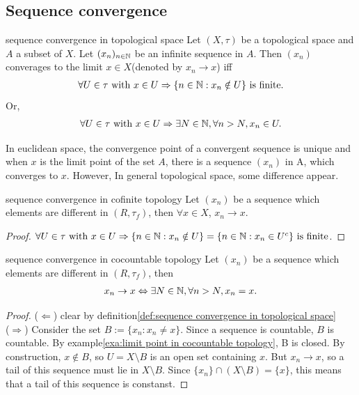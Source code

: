 \subsection{Sequence convergence}
\begin{definition}{}{sequence convergence in topological space}
    Let $(X,\tau)$ be a topological space and $A$ a subset of $X$. Let $(x_n)_{n\in\mathbb{N}}$ be an infinite sequence in $A$.
    Then $(x_n)$ converages to the limit $x\in X$(denoted by $x_n\rightarrow x$) iff
    \begin{align*}
        \forall U\in \tau \text{ with }  x\in U \Rightarrow \{n\in \mathbb{N}:x_n\notin U\} \text{ is finite}.
    \end{align*}
    Or, 
    \begin{align*}
        \forall U\in \tau \text{ with }  x\in U \Rightarrow \exists N\in \mathbb{N}, \forall n>N, x_n\in U.
    \end{align*}
\end{definition}

In euclidean space,  the convergence point of a convergent sequence is unique and when $x$ is the limit point of the set $A$, there is a sequence $(x_n)$ in A, which converges to $x$. 
However, In general topological space, some difference appear.
\begin{proposition}{}{sequence convergence in cofinite topology}
    Let $(x_n)$ be a sequence which elements are different in $(R,\tau_f)$, then $\forall x\in X$, $x_n\rightarrow x$. 
\end{proposition}
\begin{proof}
    $\forall U\in \tau \text{ with }  x\in U \Rightarrow \{n\in \mathbb{N}:x_n\notin U\}= \{n\in \mathbb{N}:x_n\in U^c\} \text{ is finite}$.
\end{proof}
\begin{proposition}{}{sequence convergence in cocountable topology}
    Let $(x_n)$ be a sequence which elements are different in $(R,\tau_f)$, then
    \begin{align*}
        x_n\rightarrow x \Leftrightarrow \exists N\in\mathbb{N}, \forall n>N, x_n=x. 
    \end{align*}
\end{proposition}
\begin{proof}
    ($\Leftarrow$) clear by definition\ref{def:sequence convergence in topological space}
    \\
    ($\Rightarrow$) Consider the set $B:= \{x_n: x_n\neq x\}$. Since a sequence is countable, $B$ is countable. By example\ref{exa:limit point in cocountable topology}, B is closed.
    By construction, $x\notin B$, so $U=X\setminus B$ is an open set containing $x$. 
    But $x_n\rightarrow x$, so a tail of this sequence must lie in $X\setminus B$. Since $\{x_n\}\cap (X\setminus B)=\{x\}$, 
    this means that a tail of this sequence is constanst.  
\end{proof}

